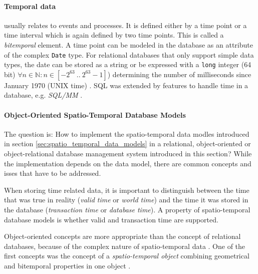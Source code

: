 

\paragraph{Temporal data} %
\label{par:temporal_data}

usually relates to events and processes. It is defined either by a time point or a time interval which is again defined by two time points. This is called a \emph{bitemporal} element. A time point can be modeled in the database as an attribute of the complex \texttt{Date} type. For relational databases that only support simple data types, the date can be stored as a string or be expressed with a \texttt{long} integer (64 bit) $\forall n \in \mathbb{N}: n \in [-2^{63}~..~2^{63}-1]$) determining the number of milliseconds since  January 1970 (UNIX time) \cite{timeInRDBMS}. SQL was extended by features to handle time in a database, e.g. \emph{SQL/MM} \cite[chapter 6]{peuquet99}.


\paragraph{Object-Oriented Spatio-Temporal Database Models} %
\label{par:object_oriented_spatio_temporal_database_models}

The question is: How to implement the spatio-temporal data modles introduced in section \ref{sec:spatio_temporal_data_models} in a relational, object-oriented or object-relational database management system introduced in this section? While the implementation depends on the data model, there are common concepts and isses that have to be addressed.

When storing time related data, it is important to distinguish between the time that was true in reality (\emph{valid time} or \emph{world time}) and the time it was stored in the database (\emph{transaction time} or \emph{database time}). A property of spatio-temporal database models is whether valid and transaction time are supported.

Object-oriented concepts are more appropriate than the concept of relational databases, because of the complex nature of spatio-temporal data \cite[section 3.9]{pelekis04stdms}. One of the first concepts was the concept of a \emph{spatio-temporal object} combining geometrical and bitemporal properties in one object \cite{worboys90stdm}.


